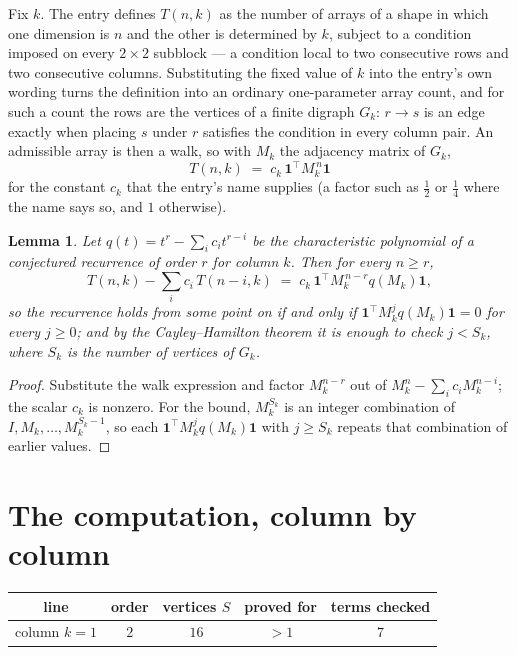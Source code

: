 \documentclass[11pt,a4paper]{article}
\theoremstyle{plain}
\newtheorem{lemma}[theorem]{Lemma}
\theoremstyle{definition}
\begin{document}
Fix $k$. The entry defines $T(n,k)$ as the number of arrays of a shape in which one dimension
is $n$ and the other is determined by $k$, subject to a condition imposed on every
$2\times2$ subblock --- a condition local to two consecutive rows and two consecutive columns.
Substituting the fixed value of $k$ into the entry's own wording turns the definition into an
ordinary one-parameter array count, and for such a count the rows are the vertices of a finite
digraph $G_k$: $r\to s$ is an edge exactly when placing $s$ under $r$ satisfies the condition
in every column pair. An admissible array is then a walk, so with $M_k$ the adjacency matrix
of $G_k$,
\[
T(n,k)\;=\;c_k\,\mathbf{1}^{\!\top}M_k^{\,n}\mathbf{1}
\]
for the constant $c_k$ that the entry's name supplies (a factor such as $\tfrac12$ or
$\tfrac14$ where the name says so, and $1$ otherwise).

\begin{lemma}\label{lem:crit}
Let $q(t)=t^{r}-\sum_i c_it^{r-i}$ be the characteristic polynomial of a conjectured
recurrence of order $r$ for column $k$. Then for every $n\ge r$,
\[
T(n,k)-\sum_i c_i\,T(n-i,k)\;=\;c_k\,\mathbf{1}^{\!\top}M_k^{\,n-r}q(M_k)\mathbf{1},
\]
so the recurrence holds from some point on if and only if
$\mathbf{1}^{\!\top}M_k^{j}q(M_k)\mathbf{1}=0$ for every $j\ge0$; and by the
Cayley--Hamilton theorem it is enough to check $j<S_k$, where $S_k$ is the number of vertices
of $G_k$.
\end{lemma}

\begin{proof}
Substitute the walk expression and factor $M_k^{n-r}$ out of $M_k^{n}-\sum_ic_iM_k^{n-i}$;
the scalar $c_k$ is nonzero. For the bound, $M_k^{S_k}$ is an integer combination of
$I,M_k,\dots,M_k^{S_k-1}$, so each $\mathbf{1}^{\!\top}M_k^{j}q(M_k)\mathbf{1}$ with
$j\ge S_k$ repeats that combination of earlier values.
\end{proof}

\section{The computation, column by column}

\begin{center}
\begin{tabular}{ccccc}
line & order & vertices $S$ & proved for & terms checked \\ \hline
column $k$$=1$ & $2$ & $16$ & $>1$ & $7$ \\
\end{tabular}
\end{center}
\end{document}

